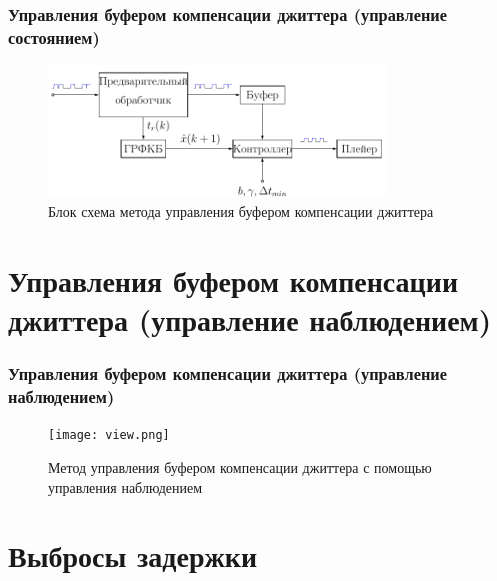 \documentclass[10pt,pdf,hyperref={unicode}]{beamer}
\begin{document}
\begin{frame}
\frametitle{Управления буфером компенсации джиттера (управление состоянием)}

\begin{figure}[!h]
\centering
\includegraphics[width=1\linewidth , height=3.5cm]{manage_buffer.png}
\caption*{Блок схема метода управления буфером компенсации джиттера}
\label{fig:man_5}
\end{figure}

\end{frame}

\section{Управления буфером компенсации джиттера (управление наблюдением)}

\begin{frame}
\frametitle{Управления буфером компенсации джиттера (управление наблюдением)}

\begin{figure}[!h]
\centering
\texttt{[image: view.png]}
\caption*{Метод управления буфером компенсации джиттера с помощью управления наблюдением}
\label{fig:man_5}
\end{figure}

\end{frame}

\section{Выбросы задержки}
\end{document}
